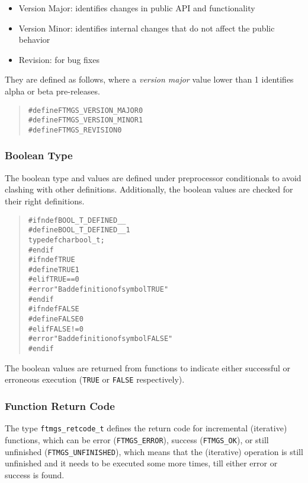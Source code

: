 \documentclass[a4paper]{article}
\newenvironment{code}%
{\begin{quote}\footnotesize\begin{alltt}}%
{\end{alltt}\end{quote}}%
\begin{document}
{\footnotesize\begin{itemize}%
\item Version Major: identifies changes in public API and functionality
\item Version Minor: identifies internal changes that do not affect the public behavior
\item Revision: for bug fixes
\end{itemize}}%
They are defined as follows, where a \emph{version major} value lower
than 1 identifies alpha or beta pre-releases.
\begin{code}
#define FTMGS_VERSION_MAJOR     0
#define FTMGS_VERSION_MINOR     1
#define FTMGS_REVISION          0
\end{code}

\subsubsection*{Boolean Type}

The boolean type and values are defined under preprocessor
conditionals to avoid clashing with other definitions. Additionally,
the boolean values are checked for their right definitions.

\begin{code}
#ifndef BOOL_T_DEFINED__
#define BOOL_T_DEFINED__    1
typedef char bool_t;
#endif
#ifndef TRUE
#define TRUE    1
#elif TRUE == 0
#error "Bad definition of symbol TRUE"
#endif
#ifndef FALSE
#define FALSE   0
#elif FALSE != 0
#error "Bad definition of symbol FALSE"
#endif
\end{code}

The boolean values are returned from functions to indicate either
successful or erroneous execution (\verb|TRUE| or \verb|FALSE|
respectively).

\subsubsection*{Function Return Code}

The type \verb|ftmgs_retcode_t| defines the return code for
incremental (iterative) functions, which can be error
(\verb|FTMGS_ERROR|), success (\verb|FTMGS_OK|), or still unfinished
(\verb|FTMGS_UNFINISHED|), which means that the (iterative) operation
is still unfinished and it needs to be executed some more times,
till either error or success is found.
\end{document}
